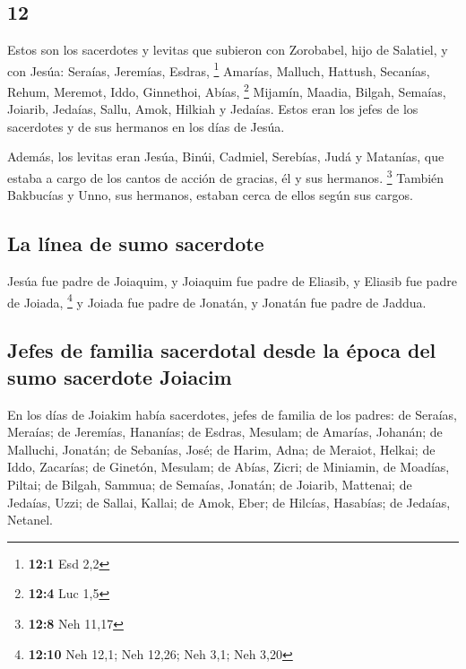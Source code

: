 \begin{paracol}{2}
\hypertarget{section-22}{%
\section{12}\label{section-22}}

 Estos son los sacerdotes y levitas que subieron con
Zorobabel, hijo de Salatiel, y con Jesúa: Seraías, Jeremías, Esdras,
\footnote{\textbf{12:1} Esd 2,2}  Amarías, Malluch,
Hattush,  Secanías, Rehum, Meremot,  Iddo,
Ginnethoi, Abías, \footnote{\textbf{12:4} Luc 1,5} 
Mijamín, Maadia, Bilgah,  Semaías, Joiarib, Jedaías,
 Sallu, Amok, Hilkiah y Jedaías. Estos eran los jefes de
los sacerdotes y de sus hermanos en los días de Jesúa.

 Además, los levitas eran Jesúa, Binúi, Cadmiel, Serebías,
Judá y Matanías, que estaba a cargo de los cantos de acción de gracias,
él y sus hermanos. \footnote{\textbf{12:8} Neh 11,17} 
También Bakbucías y Unno, sus hermanos, estaban cerca de ellos según sus
cargos.

\hypertarget{la-luxednea-de-sumo-sacerdote}{%
\subsection{La línea de sumo
sacerdote}\label{la-luxednea-de-sumo-sacerdote}}

 Jesúa fue padre de Joiaquim, y Joiaquim fue padre de
Eliasib, y Eliasib fue padre de Joiada, \footnote{\textbf{12:10} Neh
  12,1; Neh 12,26; Neh 3,1; Neh 3,20}  y Joiada fue padre
de Jonatán, y Jonatán fue padre de Jaddua.

\hypertarget{jefes-de-familia-sacerdotal-desde-la-uxe9poca-del-sumo-sacerdote-joiacim}{%
\subsection{Jefes de familia sacerdotal desde la época del sumo
sacerdote
Joiacim}\label{jefes-de-familia-sacerdotal-desde-la-uxe9poca-del-sumo-sacerdote-joiacim}}

 En los días de Joiakim había sacerdotes, jefes de
familia de los padres: de Seraías, Meraías; de Jeremías, Hananías;
 de Esdras, Mesulam; de Amarías, Johanán; 
de Malluchi, Jonatán; de Sebanías, José;  de Harim, Adna;
de Meraiot, Helkai;  de Iddo, Zacarías; de Ginetón,
Mesulam;  de Abías, Zicri; de Miniamin, de Moadías,
Piltai;  de Bilgah, Sammua; de Semaías, Jonatán;
 de Joiarib, Mattenai; de Jedaías, Uzzi; 
de Sallai, Kallai; de Amok, Eber;  de Hilcías, Hasabías;
de Jedaías, Netanel.


\end{paracol}

